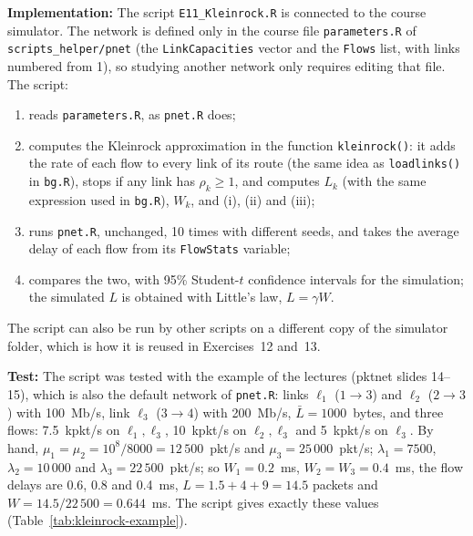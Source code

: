 ﻿\documentclass[12pt]{article}
\begin{document}
\textbf{Implementation:} The script \texttt{E11\_Kleinrock.R} is connected to
the course simulator. The network is defined only in the course file \texttt{parameters.R} of
\texttt{scripts\_helper/pnet} (the \texttt{LinkCapacities} vector and the
\texttt{Flows} list, with links numbered from 1), so studying another network
only requires editing that file. The script:
\begin{enumerate}
    \item reads \texttt{parameters.R}, as \texttt{pnet.R} does;
    \item computes the Kleinrock approximation in the function
    \texttt{kleinrock()}: it adds the rate of each flow to every link of its
    route (the same idea as \texttt{loadlinks()} in \texttt{bg.R}), stops if any
    link has $\rho_k\ge1$, and computes $L_k$ (with the same expression used in
    \texttt{bg.R}), $W_k$, and (i), (ii) and (iii);
    \item runs \texttt{pnet.R}, unchanged, 10 times with different seeds, and
    takes the average delay of each flow from its \texttt{FlowStats} variable;
    \item compares the two, with 95\% Student-$t$ confidence intervals for the
    simulation; the simulated $L$ is obtained with Little's law, $L=\gamma W$.
\end{enumerate}
The script can also be run by other scripts on a different copy of the
simulator folder, which is how it is reused in Exercises~12 and~13.

\textbf{Test:} The script was tested with the example of the lectures (pktnet
slides 14--15), which is also the default network of \texttt{pnet.R}: links
$\ell_1$ ($1\!\to\!3$) and $\ell_2$ ($2\!\to\!3$) with 100~Mb/s, link $\ell_3$
($3\!\to\!4$) with 200~Mb/s, $\bar{L}=1000$~bytes, and three flows: 7.5~kpkt/s
on $\ell_1,\ell_3$, 10~kpkt/s on $\ell_2,\ell_3$ and 5~kpkt/s on $\ell_3$.
By hand, $\mu_1=\mu_2=10^8/8000=12\,500$~pkt/s and $\mu_3=25\,000$~pkt/s;
$\lambda_1=7500$, $\lambda_2=10\,000$ and $\lambda_3=22\,500$~pkt/s; so
$W_1=0.2$~ms, $W_2=W_3=0.4$~ms, the flow delays are 0.6, 0.8 and 0.4~ms,
$L=1.5+4+9=14.5$ packets and $W=14.5/22\,500=0.644$~ms. The script gives
exactly these values (Table~\ref{tab:kleinrock-example}).
\end{document}
